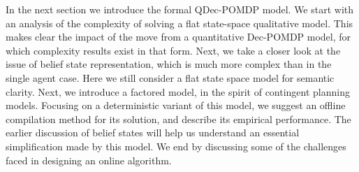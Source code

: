 \documentclass[letterpaper]{article}
\theoremstyle{definition}
\begin{document}
In the next section we introduce the formal QDec-POMDP model.  We start with an analysis of the complexity of solving a flat state-space qualitative model.  This makes clear the impact of the move from a quantitative Dec-POMDP model, for which
complexity results exist in that form. Next, we take a closer look at the issue of belief state representation, which is much more complex than in the single agent case. Here we still consider a flat state space model for semantic clarity.  Next, we introduce a factored model, in the spirit of contingent planning models. Focusing on a deterministic variant of this model, we suggest an offline compilation method for its solution, and describe its empirical performance. The earlier discussion of belief states will help us understand an essential simplification made by this model.  We end by discussing some of the challenges faced in designing an online algorithm.
\end{document}
